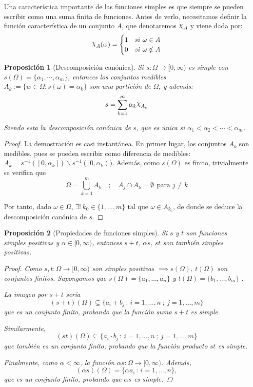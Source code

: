 \documentclass[11pt, a4paper]{article}
\DeclareRobustCommand{\rchi}{{\mathpalette\irchi\relax}}
\newcommand{\irchi}[2]{\raisebox{\depth}{$#1\chi$}} %
\theoremstyle{theorem-style}
\newtheorem{nprop}{Proposición}[section]
\theoremstyle{definition-style}
\theoremstyle{remark-style}
\theoremstyle{example-style}
\begin{document}
Una característica importante de las funciones simples es que siempre se pueden escribir como una suma finita de funciones. Antes de verlo, necesitamos definir la función característica de un conjunto $A$, que denotaremos $\rchi_A$ y viene dada por:
	\[
	\rchi_A(\omega)= \begin{cases}
	1 & si \ \omega \in A\\
	0 & si \ \omega \notin A
\end{cases}
	\]

\begin{nprop}[Descomposición canónica]
	Si $s:\Omega \to [0,\infty)$ es simple con \mbox{$s(\Omega) =  \{\alpha_1,\cdots, \alpha_m\}$}, entonces los conjuntos medibles $A_k:= \{w \in \Omega: s(\omega)= \alpha_k\}$ son una partición de $\Omega$, y además:
	\[
	s = \sum_{k=1}^m \alpha_k \rchi_{A_k}
	\]
	
Siendo esta la descomposición canónica de $s$, que es única si $\alpha_1 < \alpha_2 <  \cdots <\alpha_m$.
\end{nprop}

\begin{proof} La demostración es casi instantánea. En primer lugar, los conjuntos $A_k$ son medibles, pues se pueden escribir como diferencia de medibles: \mbox{$A_k = s^{-1}([0,\alpha_k])\backslash s^{-1}([0,\alpha_k))$.} Además, como $s(\Omega)$ es finito, trivialmente se verifica que $$\Omega = \bigcup_{k=1}^m A_k \quad ; \quad A_j \cap A_k = \emptyset \ \ \text{para } j \ne k$$

Por tanto, dado $\omega \in \Omega$, $\exists ! \ k_0 \in \{1,\dots,m\} \text{ tal que } \omega \in A_{k_0}$, de donde se deduce la descomposición canónica de $s$.
\end{proof}


\begin{nprop}[Propiedades de funciones simples]
	Si $s$ y $t$ son funciones simples positivas y $\alpha \in [0,\infty)$, entonces $s+t, \ \alpha s, \ st$ son también simples positivas.
	
\begin{proof}
Como $s,t: \Omega \longrightarrow [0,\infty)$ son simples positivas $\implies s(\Omega) , \ t(\Omega)$ son conjuntos finitos. Supongamos que $s(\Omega) =\{ a_1, \dots ,a_n\}$  y $t(\Omega) = \{ b_1, \dots ,b_m\}$ . 

La imagen por $s+ t$ sería
 $$(s+t)(\Omega) \subseteq \{ a_i + b_j \, :\, i=1,\dots ,n \ ; \ j=1,\dots ,m\}$$
que es un conjunto finito, probando que la función suma $s+t$ es simple.

Similarmente, $$(st)(\Omega ) \subseteq \{ a_i \cdot b_j \, : \, i=1,\dots ,n \ ; \ j=1,\dots ,m \}$$
que también es un conjunto finito, probando que la función producto $st$ es simple.

Finalmente, como $\alpha< \infty$, la función $\alpha s:\Omega \longrightarrow [0,\infty)$. Además, 
$$(\alpha s)(\Omega) = \{ \alpha a_i \,:\, i=1,\dots ,n \},$$
que es un  conjunto finito, probando que $\alpha s$ es simple.
\end{proof}
\end{nprop}
\end{document}
